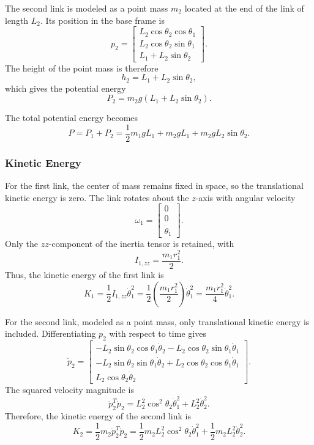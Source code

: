 \documentclass{article}
\begin{document}
The second link is modeled as a point mass \(m_2\) located at the end of the link of length \(L_2\). Its position in the base frame is
\[
p_2 =
\begin{bmatrix}
L_2 \cos\theta_2 \cos\theta_1 \\
L_2 \cos\theta_2 \sin\theta_1 \\
L_1 + L_2 \sin\theta_2
\end{bmatrix}.
\]
The height of the point mass is therefore
\[
h_2 = L_1 + L_2\sin\theta_2,
\]
which gives the potential energy
\[
P_2 = m_2 g (L_1 + L_2\sin\theta_2).
\]

The total potential energy becomes
\[
P = P_1 + P_2
= \frac{1}{2}m_1 g L_1 + m_2 g L_1 + m_2 g L_2 \sin\theta_2.
\]

\subsubsection*{Kinetic Energy}

For the first link, the center of mass remains fixed in space, so the translational kinetic energy is zero. The link rotates about the \(z\)-axis with angular velocity
\[
\omega_1 = \begin{bmatrix}0 \\ 0 \\ \dot{\theta}_1\end{bmatrix}.
\]
Only the \(zz\)-component of the inertia tensor is retained, with
\[
I_{1,zz} = \frac{m_1 r_1^2}{2}.
\]
Thus, the kinetic energy of the first link is
\[
K_1 = \frac{1}{2} I_{1,zz} \dot{\theta}_1^2
= \frac{1}{2}\left(\frac{m_1 r_1^2}{2}\right)\dot{\theta}_1^2
= \frac{m_1 r_1^2}{4}\dot{\theta}_1^2.
\]

For the second link, modeled as a point mass, only translational kinetic energy is included. Differentiating \(p_2\) with respect to time gives
\[
\dot{p}_2 =
\begin{bmatrix}
-L_2 \sin\theta_2 \cos\theta_1 \dot{\theta}_2
- L_2 \cos\theta_2 \sin\theta_1 \dot{\theta}_1 \\
-L_2 \sin\theta_2 \sin\theta_1 \dot{\theta}_2
+ L_2 \cos\theta_2 \cos\theta_1 \dot{\theta}_1 \\
L_2 \cos\theta_2 \dot{\theta}_2
\end{bmatrix}.
\]
The squared velocity magnitude is
\[
\dot{p}_2^T \dot{p}_2
= L_2^2 \cos^2\theta_2 \dot{\theta}_1^2 + L_2^2 \dot{\theta}_2^2.
\]
Therefore, the kinetic energy of the second link is
\[
K_2 = \frac{1}{2} m_2 \dot{p}_2^T \dot{p}_2
= \frac{1}{2} m_2 L_2^2 \cos^2\theta_2 \dot{\theta}_1^2
+ \frac{1}{2} m_2 L_2^2 \dot{\theta}_2^2.
\]
\end{document}
